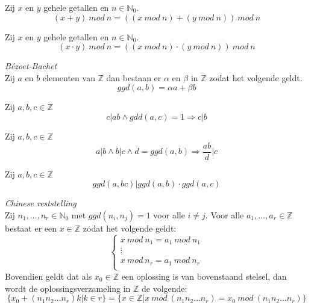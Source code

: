 \documentclass[main.tex]{subfiles}
\begin{document}
\begin{st}
  Zij $x$ en $y$ gehele getallen en $n\in \mathbb{N}_{0}$.
  \[ (x+y)\ mod\ n = ((x\ mod\ n)+(y\ mod\ n))\ mod\ n \]

\end{st}

\begin{st}
  Zij $x$ en $y$ gehele getallen en $n\in \mathbb{N}_{0}$.
  \[ (x\cdot y)\ mod\ n = ((x\ mod\ n)\cdot(y\ mod\ n))\ mod\ n \]

\end{st}


\begin{st}
  \emph{B\'ezoet-Bachet}\\
  Zij $a$ en $b$ elementen van $\mathbb{Z}$ dan bestaan er $\alpha$ en $\beta$ in $\mathbb{Z}$ zodat het volgende geldt.
  \[ ggd(a,b) = \alpha a + \beta b \]

\end{st}

\begin{st}
  Zij $a,b,c \in \mathbb{Z}$
  \[ c|ab \wedge gdd(a,c) = 1 \Rightarrow c|b \]

\end{st}

\begin{st}
  Zij $a,b,c \in \mathbb{Z}$
  \[ a|b \wedge b|c \wedge d=ggd(a,b) \Rightarrow \frac{ab}{d}|c \]

\end{st}

\begin{st}
  Zij $a,b,c \in \mathbb{Z}$
  \[ ggd(a,bc)|ggd(a,b)\cdot ggd(a,c) \]

\end{st}

\begin{st}
  \emph{Chinese reststelling}\\
  Zij $n_{1},\dotsc,n_{r} \in \mathbb{N}_{0}$ met $ggd(n_{i},n_{j}) = 1$ voor alle $i\neq j$.
  Voor alle $a_{1},\dotsc,a_{r} \in \mathbb{Z}$ bestaat er een $x \in \mathbb{Z}$ zodat het volgende geldt:
  \[
  \left\{
    \begin{array}{rl}
    x\ mod\ n_{1} = a_{1}\ mod\ n_{1}\\
    \vdots\\
    x\ mod\ n_{r} = a_{1}\ mod\ n_{r}\\
  \end{array}
  \right.
  \]
  Bovendien geldt dat als $x_{0} \in \mathbb{Z}$ een oplossing is van bovenstaand stelsel, dan wordt de oplossingsverzameling in $\mathbb{Z}$ de volgende:
  \[ \{ x_{0} + (n_{1}n_{2}\dotsc n_{r})k | k \in r\} = \{ x \in \mathbb{Z} | x\ mod\ (n_{1}n_{2}\dotsc n_{r}) = x_{0}\ mod\ (n_{1}n_{2}\dotsc n_{r}) \}\]

\end{st}
\end{document}
